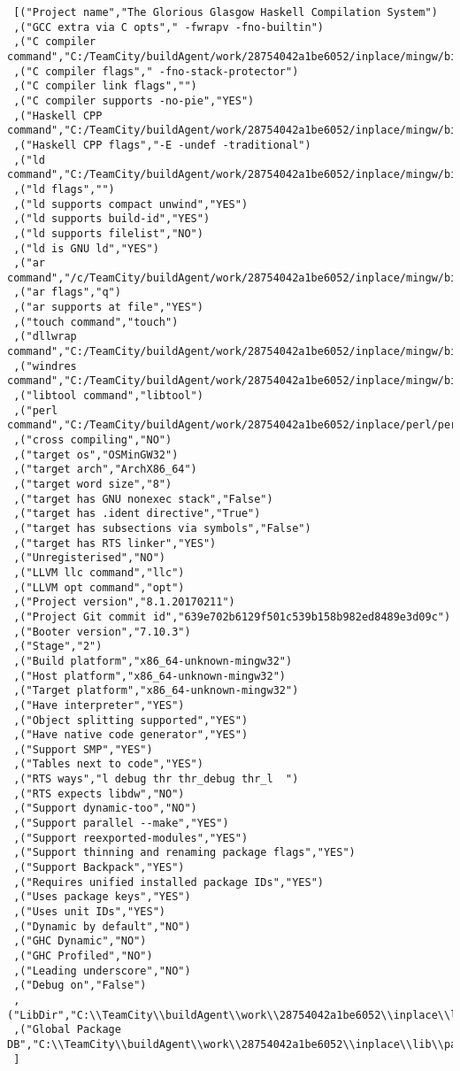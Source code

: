 \begin{verbatim}
 [("Project name","The Glorious Glasgow Haskell Compilation System")
 ,("GCC extra via C opts"," -fwrapv -fno-builtin")
 ,("C compiler command","C:/TeamCity/buildAgent/work/28754042a1be6052/inplace/mingw/bin/gcc.exe")
 ,("C compiler flags"," -fno-stack-protector")
 ,("C compiler link flags","")
 ,("C compiler supports -no-pie","YES")
 ,("Haskell CPP command","C:/TeamCity/buildAgent/work/28754042a1be6052/inplace/mingw/bin/gcc.exe")
 ,("Haskell CPP flags","-E -undef -traditional")
 ,("ld command","C:/TeamCity/buildAgent/work/28754042a1be6052/inplace/mingw/bin/ld.exe")
 ,("ld flags","")
 ,("ld supports compact unwind","YES")
 ,("ld supports build-id","YES")
 ,("ld supports filelist","NO")
 ,("ld is GNU ld","YES")
 ,("ar command","/c/TeamCity/buildAgent/work/28754042a1be6052/inplace/mingw/bin/ar")
 ,("ar flags","q")
 ,("ar supports at file","YES")
 ,("touch command","touch")
 ,("dllwrap command","C:/TeamCity/buildAgent/work/28754042a1be6052/inplace/mingw/bin/dllwrap.exe")
 ,("windres command","C:/TeamCity/buildAgent/work/28754042a1be6052/inplace/mingw/bin/windres.exe")
 ,("libtool command","libtool")
 ,("perl command","C:/TeamCity/buildAgent/work/28754042a1be6052/inplace/perl/perl")
 ,("cross compiling","NO")
 ,("target os","OSMinGW32")
 ,("target arch","ArchX86_64")
 ,("target word size","8")
 ,("target has GNU nonexec stack","False")
 ,("target has .ident directive","True")
 ,("target has subsections via symbols","False")
 ,("target has RTS linker","YES")
 ,("Unregisterised","NO")
 ,("LLVM llc command","llc")
 ,("LLVM opt command","opt")
 ,("Project version","8.1.20170211")
 ,("Project Git commit id","639e702b6129f501c539b158b982ed8489e3d09c")
 ,("Booter version","7.10.3")
 ,("Stage","2")
 ,("Build platform","x86_64-unknown-mingw32")
 ,("Host platform","x86_64-unknown-mingw32")
 ,("Target platform","x86_64-unknown-mingw32")
 ,("Have interpreter","YES")
 ,("Object splitting supported","YES")
 ,("Have native code generator","YES")
 ,("Support SMP","YES")
 ,("Tables next to code","YES")
 ,("RTS ways","l debug thr thr_debug thr_l  ")
 ,("RTS expects libdw","NO")
 ,("Support dynamic-too","NO")
 ,("Support parallel --make","YES")
 ,("Support reexported-modules","YES")
 ,("Support thinning and renaming package flags","YES")
 ,("Support Backpack","YES")
 ,("Requires unified installed package IDs","YES")
 ,("Uses package keys","YES")
 ,("Uses unit IDs","YES")
 ,("Dynamic by default","NO")
 ,("GHC Dynamic","NO")
 ,("GHC Profiled","NO")
 ,("Leading underscore","NO")
 ,("Debug on","False")
 ,("LibDir","C:\\TeamCity\\buildAgent\\work\\28754042a1be6052\\inplace\\lib")
 ,("Global Package DB","C:\\TeamCity\\buildAgent\\work\\28754042a1be6052\\inplace\\lib\\package.conf.d")
 ]
\end{verbatim}
